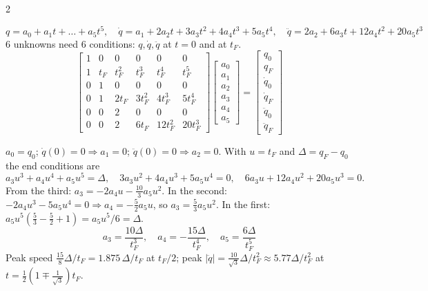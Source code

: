 \begin{multicols}{2}
\nopagebreak[4]
\begin{fbx}[Quintic \pg{29}]
\[q=a_0+a_1t+\dots+a_5t^5,\quad \dot q=a_1+2a_2t+3a_3t^2+4a_4t^3+5a_5t^4,\quad \ddot q=2a_2+6a_3t+12a_4t^2+20a_5t^3\]
6 unknowns need 6 conditions: $q,\dot q,\ddot q$ at $t=0$ and at $t_F$.
\[\begin{bmatrix}1&0&0&0&0&0\\1&t_F&t_F^2&t_F^3&t_F^4&t_F^5\\0&1&0&0&0&0\\0&1&2t_F&3t_F^2&4t_F^3&5t_F^4\\0&0&2&0&0&0\\0&0&2&6t_F&12t_F^2&20t_F^3\end{bmatrix}\!\begin{bmatrix}a_0\\a_1\\a_2\\a_3\\a_4\\a_5\end{bmatrix}=\begin{bmatrix}q_0\\q_F\\\dot q_0\\\dot q_F\\\ddot q_0\\\ddot q_F\end{bmatrix}\]
\end{fbx}
\begin{deriv}
$a_0=q_0$; $\dot q(0)=0\Rightarrow a_1=0$; $\ddot q(0)=0\Rightarrow a_2=0$. With $u=t_F$ and $\Delta=q_F-q_0$ the end conditions are
\[a_3u^3+a_4u^4+a_5u^5=\Delta,\quad 3a_3u^2+4a_4u^3+5a_5u^4=0,\quad 6a_3u+12a_4u^2+20a_5u^3=0.\]
From the third: $a_3=-2a_4u-\tfrac{10}3a_5u^2$. In the second: $-2a_4u^3-5a_5u^4=0\Rightarrow a_4=-\tfrac52a_5u$, so $a_3=\tfrac53a_5u^2$. In the first: $a_5u^5(\tfrac53-\tfrac52+1)=a_5u^5/6=\Delta$.
\[\boxed{a_3=\frac{10\Delta}{t_F^3},\quad a_4=-\frac{15\Delta}{t_F^4},\quad a_5=\frac{6\Delta}{t_F^5}}\]
Peak speed $\tfrac{15}{8}\Delta/t_F=1.875\,\Delta/t_F$ at $t_F/2$; peak $|\ddot q|=\tfrac{10}{\sqrt3}\Delta/t_F^2\approx5.77\Delta/t_F^2$ at $t=\tfrac12(1\mp\tfrac1{\sqrt3})t_F$. \chk
\end{deriv}
\begin{worked}[$0\to15^\circ$ in 1\,s]

\end{worked}
\end{multicols}
